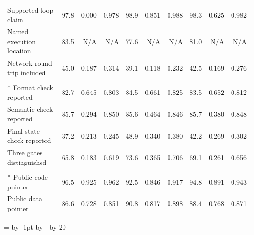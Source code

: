 \begin{table}[!htbp]
{\begin{tabular}{lrrrrrrrrr}
Supported loop claim & 97.8 & 0.000 & 0.978 & 98.9 & 0.851 & 0.988 & 98.3 & 0.625 & 0.982 \\
Named execution location & 83.5 & N/A & N/A & 77.6 & N/A & N/A & 81.0 & N/A & N/A \\
Network round trip included & 45.0 & 0.187 & 0.314 & 39.1 & 0.118 & 0.232 & 42.5 & 0.169 & 0.276 \\
\rowcolor{ebAmber!45}\multicolumn{10}{l}{\textbf{\itshape Validation responsibilities}} \\*
Format check reported & 82.7 & 0.645 & 0.803 & 84.5 & 0.661 & 0.825 & 83.5 & 0.652 & 0.812 \\
Semantic check reported & 85.7 & 0.294 & 0.850 & 85.6 & 0.464 & 0.846 & 85.7 & 0.380 & 0.848 \\
Final-state check reported & 37.2 & 0.213 & 0.245 & 48.9 & 0.340 & 0.380 & 42.2 & 0.269 & 0.302 \\
Three gates distinguished & 65.8 & 0.183 & 0.619 & 73.6 & 0.365 & 0.706 & 69.1 & 0.261 & 0.656 \\
\rowcolor{ebAmber!45}\multicolumn{10}{l}{\textbf{\itshape Artifact pointers}} \\*
Public code pointer & 96.5 & 0.925 & 0.962 & 92.5 & 0.846 & 0.917 & 94.8 & 0.891 & 0.943 \\
Public data pointer & 86.6 & 0.728 & 0.851 & 90.8 & 0.817 & 0.898 & 88.4 & 0.768 & 0.871 \\
\bottomrule
\end{tabular}}
\setlength{\tabcolsep}{0pt}
=\linewidth\advance{} by -1pt\advance{} by -\divide{} by 20
\ifdim\dimen0<1.5pt \dimen0=1.5pt\fi
\setlength{\tabcolsep}{\dimen0}
\familytab
\end{table}
\endgroup

